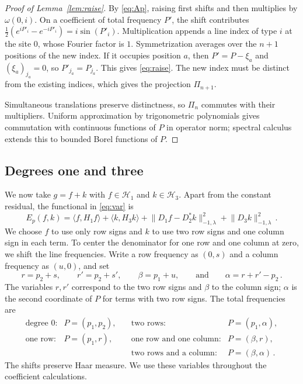 \documentclass[11pt]{amsart}
\theoremstyle{plain}
\theoremstyle{definition}
\newcommand{\1}{\mathbf 1}
\newcommand{\ip}[2]{\langle #1,#2\rangle}
\newcommand{\norm}[1]{\lVert #1\rVert}
\newcommand{\Hs}{\mathcal H}
\newcommand{\Hminus}[1]{\norm{#1}_{-1,\lambda}}
\begin{document}
\begin{proof}[Proof of Lemma~\ref{lem:raise}]
By \eqref{eq:Ap}, raising first shifts and then multiplies by
$\omega(0,i)$.  On a coefficient of total frequency $P'$, the shift
contributes
$\tfrac12(e^{iP'_i}-e^{-iP'_i})=i\sin(P'_i)$.  Multiplication appends a line
index of type $i$ at the site $0$, whose Fourier factor is $1$.
Symmetrization averages over the $n+1$ positions of the new index.  If it
occupies position $a$, then $P'=P-\xi_a$ and $(\xi_a)_{j_a}=0$, so
$P'_{j_a}=P_{j_a}$.  This gives \eqref{eq:raise}.  The new index must be
distinct from the existing indices, which gives the projection $\Pi_{n+1}$.

Simultaneous translations preserve distinctness, so $\Pi_n$ commutes
with their multipliers.  Uniform approximation by trigonometric polynomials
gives commutation with continuous functions of $P$ in operator norm;
spectral calculus extends this to bounded Borel functions of $P$.
\end{proof}

\subsection{Degrees one and three}\label{ssec:degrees-one-three}\label{ssec:low-coordinates}

We now take $g=f+k$ with $f\in\Hs_1$ and $k\in\Hs_3$.
Apart from the constant residual, the functional in \eqref{eq:var} is
\begin{equation}\label{eq:E}
  E_p(f,k)=\ip f{H_1f}+\ip k{H_3k}
  +\Hminus{D_1f-D_2^*k}^2+\Hminus{D_3k}^2\, .
\end{equation}
We choose $f$ to use only row signs and $k$ to use two row signs and
one column sign in each term.  To center the denominator for one row and
one column at zero, we shift the line frequencies.  Write a row frequency
as $(0,s)$ and a column frequency as $(u,0)$, and set
\begin{equation}\label{eq:shift}
  r=p_2+s,\qquad r'=p_2+s',\qquad \beta=p_1+u,
  \qquad\text{and}\qquad \alpha=r+r'-p_2\, .
\end{equation}
The variables $r,r'$ correspond to the two row signs and $\beta$ to the
column sign; $\alpha$ is the second coordinate of $P$ for terms with two
row signs.  The total frequencies are
\[
\renewcommand{\arraystretch}{1.15}
\begin{array}{llll}
  \text{degree $0$:} & P=(p_1,p_2), &\quad
  \text{two rows:} & P=(p_1,\alpha),\\
  \text{one row:} & P=(p_1,r), &\quad
  \text{one row and one column:} & P=(\beta,r),\\
  & &\quad \text{two rows and a column:} & P=(\beta,\alpha)\, .
\end{array}
\]
The shifts preserve Haar measure.  We use these variables throughout the
coefficient calculations.
\end{document}
